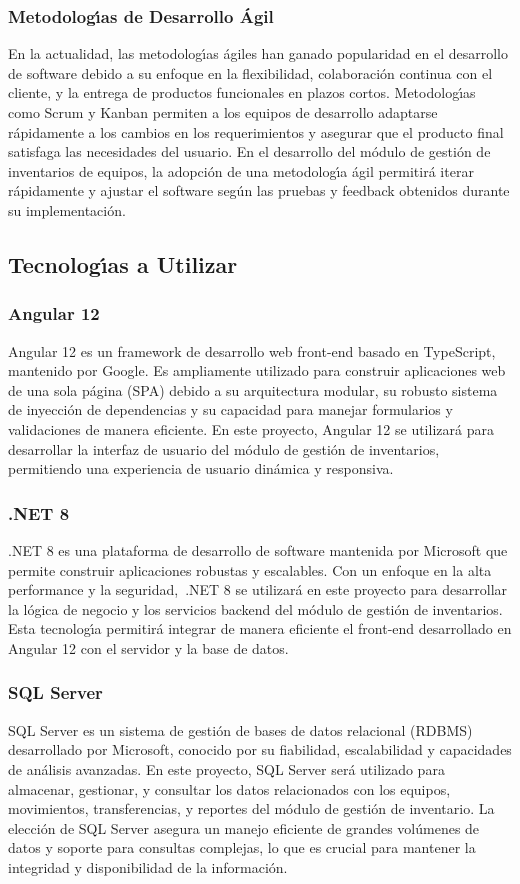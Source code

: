 \documentclass[stu, 12pt, letterpaper, donotrepeattitle, floatsintext, natbib]{apa7}
\begin{document}
\subsubsection{Metodolog\'{\i}as de Desarrollo \'Agil}
En la actualidad, las metodolog\'{\i}as \'agiles han ganado popularidad en el desarrollo de software debido a su enfoque en la flexibilidad, colaboraci\'on continua
con el cliente, y la entrega de productos funcionales en plazos cortos. Metodolog\'{\i}as como Scrum y Kanban permiten a los equipos de desarrollo adaptarse
r\'apidamente a los cambios en los requerimientos y asegurar que el producto final satisfaga las necesidades del usuario. En el desarrollo del m\'odulo de gesti\'on
de inventarios de equipos, la adopci\'on de una metodolog\'{\i}a \'agil permitir\'a iterar r\'apidamente y ajustar el software seg\'un las pruebas y feedback
obtenidos durante su implementaci\'on.
\subsection{Tecnolog\'{\i}as a Utilizar}
\subsubsection{Angular 12}
Angular 12 es un framework de desarrollo web front-end basado en TypeScript, mantenido por Google. Es ampliamente utilizado para construir aplicaciones web de una
sola p\'agina (SPA) debido a su arquitectura modular, su robusto sistema de inyecci\'on de dependencias y su capacidad para manejar formularios y validaciones de
manera eficiente. En este proyecto, Angular 12 se utilizar\'a para desarrollar la interfaz de usuario del m\'odulo de gesti\'on de inventarios, permitiendo una
experiencia de usuario din\'amica y responsiva.
\subsubsection{.NET 8}
.NET 8 es una plataforma de desarrollo de software mantenida por Microsoft que permite construir aplicaciones robustas y escalables. Con un enfoque en la alta
performance y la seguridad,~.NET 8 se utilizar\'a en este proyecto para desarrollar la l\'ogica de negocio y los servicios backend del m\'odulo de gesti\'on de
inventarios. Esta tecnolog\'{\i}a permitir\'a integrar de manera eficiente el front-end desarrollado en Angular 12 con el servidor y la base de datos.
\subsubsection{SQL Server}
SQL Server es un sistema de gesti\'on de bases de datos relacional (RDBMS) desarrollado por Microsoft, conocido por su fiabilidad, escalabilidad y capacidades de
an\'alisis avanzadas. En este proyecto, SQL Server ser\'a utilizado para almacenar, gestionar, y consultar los datos relacionados con los equipos, movimientos,
transferencias, y reportes del m\'odulo de gesti\'on de inventario. La elecci\'on de SQL Server asegura un manejo eficiente de grandes vol\'umenes de datos y soporte
para consultas complejas, lo que es crucial para mantener la integridad y disponibilidad de la informaci\'on.
\end{document}
